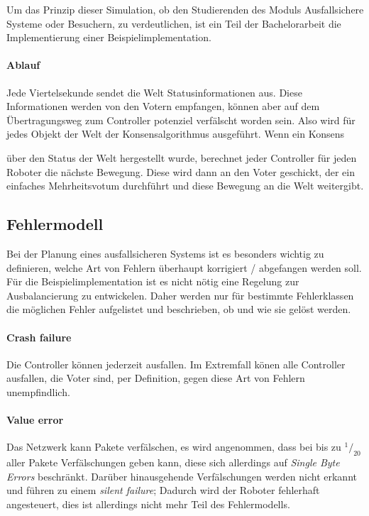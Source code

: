 
Um das Prinzip dieser Simulation, ob den Studierenden des Moduls Ausfallsichere Systeme oder Besuchern, zu verdeutlichen, ist ein Teil der Bachelorarbeit die Implementierung einer
Beispielimplementation.

\paragraph{Ablauf} Jede Viertelsekunde sendet die Welt Statusinformationen aus. Diese Informationen werden von den Votern empfangen, k{\"{o}}nnen
aber auf dem {\"{U}}bertragungsweg zum Controller potenziel verf{\"{a}}lscht worden sein. Also wird f{\"{u}}r jedes Objekt der Welt der Konsensalgorithmus ausgef{\"{u}}hrt. Wenn ein Konsens {\"{u}ber den Status der Welt hergestellt wurde, berechnet 
jeder Controller f{\"{u}}r jeden Roboter die n{\"{a}}chste Bewegung. Diese wird dann an den Voter geschickt, der ein einfaches Mehrheitsvotum durchf{\"{u}}hrt und diese Bewegung an die Welt weitergibt.

\subsection{Fehlermodell} \label{error-model}
Bei der Planung eines ausfallsicheren Systems ist es besonders wichtig zu definieren, welche Art von Fehlern
{\"{u}}berhaupt korrigiert / abgefangen werden soll. F{\"{u}}r die Beispielimplementation ist es nicht
n{\"{o}}tig eine Regelung zur Ausbalancierung zu entwickelen. Daher werden nur f{\"{u}}r bestimmte Fehlerklassen
die m{\"{o}}glichen Fehler aufgelistet und beschrieben, ob und wie sie gel{\"{o}}st werden.

\paragraph{Crash failure} Die Controller k{\"{o}}nnen jederzeit ausfallen. Im Extremfall k{\"{o}}nen alle Controller ausfallen, die Voter sind, per Definition, gegen diese Art von Fehlern unempfindlich.

\paragraph{Value error} Das Netzwerk kann Pakete verf{\"{a}}lschen, es wird angenommen, dass bei bis zu
$^1/_{20}$ aller Pakete Verf{\"{a}}lschungen geben kann, diese sich allerdings auf
\textit{Single Byte Errors} beschr{\"{a}}nkt. Dar{\"{u}}ber hinausgehende Verf{\"{a}}lschungen werden nicht
erkannt und f{\"{u}}hren zu einem \textit{silent failure}; Dadurch wird der Roboter fehlerhaft angesteuert,
dies ist allerdings nicht mehr Teil des Fehlermodells.

}
